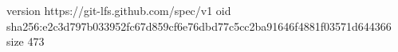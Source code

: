 version https://git-lfs.github.com/spec/v1
oid sha256:e2c3d797b033952fc67d859cf6e76dbd77c5cc2ba91646f4881f03571d644366
size 473

